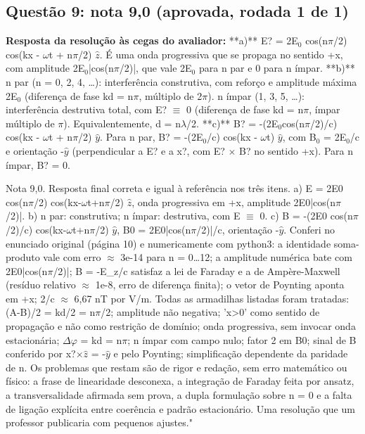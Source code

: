 \documentclass{article}%
\begin{document}
\subsection*{Questão 9: nota 9,0 (aprovada, rodada 1 de 1)}%
\textbf{Resposta da resolução às cegas do avaliador:} **a)** E? = 2E$_{0}$ cos(n$\pi$/2) cos(kx - $\omega$t + n$\pi$/2) $\hat z$. É uma onda progressiva que se propaga no sentido +x, com amplitude 2E$_{0}$|cos(n$\pi$/2)|, que vale 2E$_{0}$ para n par e 0 para n ímpar.\newline%
\newline%
**b)** n par (n = 0, 2, 4, \ldots{}): interferência construtiva, com reforço e amplitude máxima 2E$_{0}$ (diferença de fase kd = n$\pi$, múltiplo de 2$\pi$). n ímpar (1, 3, 5, \ldots{}): interferência destrutiva total, com E? $\equiv$ 0 (diferença de fase kd = n$\pi$, ímpar múltiplo de $\pi$). Equivalentemente, d = n$\lambda$/2.\newline%
\newline%
**c)** B? = -(2E$_{0}$cos(n$\pi$/2)/c) cos(kx - $\omega$t + n$\pi$/2) $\hat y$. Para n par, B? = -(2E$_{0}$/c) cos(kx - $\omega$t) $\hat y$, com B$_{0}$ = 2E$_{0}$/c e orientação -$\hat y$ (perpendicular a E? e a x?, com E? $\times$ B? no sentido +x). Para n ímpar, B? = 0.\par %
Nota 9,0. Resposta final correta e igual à referência nos três itens. a) E = 2E0 cos(n$\pi$/2) cos(kx-$\omega$t+n$\pi$/2) $\hat z$, onda progressiva em +x, amplitude 2E0|cos(n$\pi$/2)|. b) n par: construtiva; n ímpar: destrutiva, com E $\equiv$ 0. c) B = -(2E0 cos(n$\pi$/2)/c) cos(kx-$\omega$t+n$\pi$/2) $\hat y$, B0 = 2E0|cos(n$\pi$/2)|/c, orientação -$\hat y$. Conferi no enunciado original (página 10) e numericamente com python3: a identidade soma{-}produto vale com erro $\approx$ 3e{-}14 para n = 0\ldots{}12; a amplitude numérica bate com 2E0|cos(n$\pi$/2)|; B = -E\_z/c satisfaz a lei de Faraday e a de Ampère{-}Maxwell (resíduo relativo $\approx$ 1e{-}8, erro de diferença finita); o vetor de Poynting aponta em +x; 2/c $\approx$ 6,67 nT por V/m. Todas as armadilhas listadas foram tratadas: (A-B)/2 = kd/2 = n$\pi$/2; amplitude não negativa; 'x>0' como sentido de propagação e não como restrição de domínio; onda progressiva, sem invocar onda estacionária; $\Delta$$\varphi$ = kd = n$\pi$; n ímpar com campo nulo; fator 2 em B0; sinal de B conferido por x?$\times$$\hat z$ = -$\hat y$ e pelo Poynting; simplificação dependente da paridade de n. Os problemas que restam são de rigor e redação, sem erro matemático ou físico: a frase de linearidade desconexa, a integração de Faraday feita por ansatz, a transversalidade afirmada sem prova, a dupla formulação sobre n = 0 e a falta de ligação explícita entre coerência e padrão estacionário. Uma resolução que um professor publicaria com pequenos ajustes."%
\end{document}
